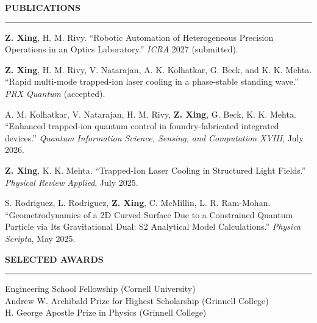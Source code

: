 \documentclass{article}
\newenvironment{rSection}[1]{%
  \smallskip
  \MakeUppercase{\textbf{#1}}
  \smallskip
  \hrule
  \begin{list}{}{%
    \setlength{\leftmargin}{0em}
    \setlength{\topsep}{0.25em}
    \setlength{\partopsep}{0pt}
    \setlength{\parsep}{0pt}
    \setlength{\itemsep}{0.15em}
  }
  \item[]
}{%
  \end{list}
}
\begin{document}




\begin{rSection}{Publications}
\textbf{Z. Xing}, H. M. Rivy. ``Robotic Automation of Heterogeneous Precision Operations in an Optics Laboratory.'' \textit{ICRA} 2027 (submitted).

\item \textbf{Z. Xing}, H. M. Rivy, V. Natarajan, A. K. Kolhatkar, G. Beck, and K. K. Mehta. ``Rapid multi-mode trapped-ion laser cooling in a phase-stable standing wave.'' \textit{PRX Quantum} (accepted).

\item A. M. Kolhatkar, V. Natarajan, H. M. Rivy, \textbf{Z. Xing}, G. Beck, K. K. Mehta. ``Enhanced trapped-ion quantum control in foundry-fabricated integrated devices.'' \textit{Quantum Information Science, Sensing, and Computation XVIII}, July 2026.

\item \textbf{Z. Xing}, K. K. Mehta. ``Trapped-Ion Laser Cooling in Structured Light Fields.'' \textit{Physical Review Applied}, July 2025.

\item S. Rodriguez, L. Rodriguez, \textbf{Z. Xing}, C. McMillin, L. R. Ram-Mohan. ``Geometrodynamics of a 2D Curved Surface Due to a Constrained Quantum Particle via Its Gravitational Dual: S2 Analytical Model Calculations.'' \textit{Physica Scripta}, May 2025.

\end{rSection}








\begin{rSection}{Selected Awards}
Engineering School Fellowship (Cornell University)\\
Andrew W. Archibald Prize for Highest Scholarship (Grinnell College)\\
H. George Apostle Prize in Physics (Grinnell College)\\
\end{rSection}
\end{document}
